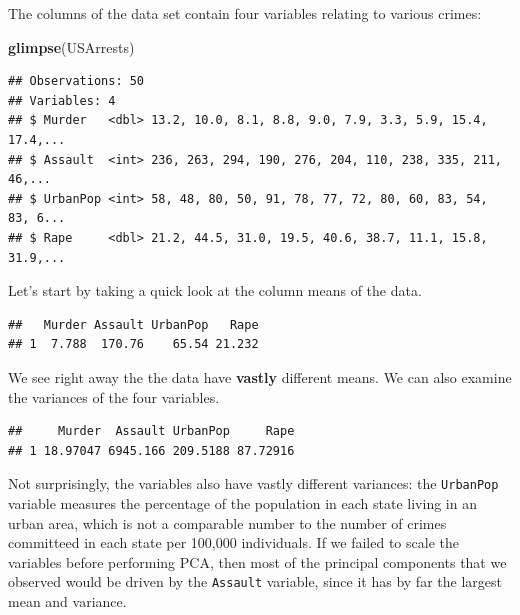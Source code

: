 \documentclass[openany]{book}
\newenvironment{Shaded}{\begin{snugshade}}{\end{snugshade}}
\newcommand{\KeywordTok}[1]{\textcolor[rgb]{0.13,0.29,0.53}{\textbf{#1}}}
\newcommand{\NormalTok}[1]{#1}
\newcommand{\OperatorTok}[1]{\textcolor[rgb]{0.81,0.36,0.00}{\textbf{#1}}}
\newcommand{\StringTok}[1]{\textcolor[rgb]{0.31,0.60,0.02}{#1}}
\begin{document}
The columns of the data set contain four variables relating to various crimes:

\begin{Shaded}
\begin{Highlighting}[]
\KeywordTok{glimpse}\NormalTok{(USArrests)}
\end{Highlighting}
\end{Shaded}

\begin{verbatim}
## Observations: 50
## Variables: 4
## $ Murder   <dbl> 13.2, 10.0, 8.1, 8.8, 9.0, 7.9, 3.3, 5.9, 15.4, 17.4,...
## $ Assault  <int> 236, 263, 294, 190, 276, 204, 110, 238, 335, 211, 46,...
## $ UrbanPop <int> 58, 48, 80, 50, 91, 78, 77, 72, 80, 60, 83, 54, 83, 6...
## $ Rape     <dbl> 21.2, 44.5, 31.0, 19.5, 40.6, 38.7, 11.1, 15.8, 31.9,...
\end{verbatim}

Let's start by taking a quick look at the column means of the data.

\begin{Shaded}
\end{Shaded}

\begin{verbatim}
##   Murder Assault UrbanPop   Rape
## 1  7.788  170.76    65.54 21.232
\end{verbatim}

We see right away the the data have \textbf{vastly} different means. We can also examine the variances of the four variables.

\begin{Shaded}
\end{Shaded}

\begin{verbatim}
##     Murder  Assault UrbanPop     Rape
## 1 18.97047 6945.166 209.5188 87.72916
\end{verbatim}

Not surprisingly, the variables also have vastly different variances: the
\texttt{UrbanPop} variable measures the percentage of the population in each state
living in an urban area, which is not a comparable number to the number
of crimes committeed in each state per 100,000 individuals. If we failed to scale the
variables before performing PCA, then most of the principal components
that we observed would be driven by the \texttt{Assault} variable, since it has by
far the largest mean and variance.
\end{document}
